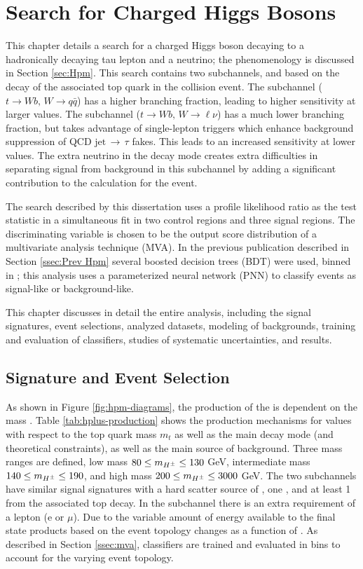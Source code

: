 \chapter{Search for Charged Higgs Bosons}\label{chap:hpana}
	This chapter details a search for a charged Higgs boson decaying to a hadronically decaying tau lepton and a neutrino; the phenomenology is discussed in Section \ref{sec:Hpm}. This search contains two subchannels, \taujets and \taulep based on the decay of the  associated top quark in the collision event. The \taujets subchannel ($t\rightarrow Wb, \, W \rightarrow q\bar{q}$)  has a higher branching fraction, leading to higher sensitivity at larger \mHpm values. The \taulep subchannel ($t\rightarrow Wb, \, W \rightarrow \ell \nu$)  has a much lower branching fraction, but takes advantage of single-lepton triggers which enhance background suppression of QCD $\mathrm{jet} \, \rightarrow \, \tau$ fakes. This leads to an increased sensitivity at lower \mHpm values. The extra neutrino in the \taulep decay mode creates extra difficulties in separating signal from background in this subchannel by adding a significant contribution to the \Etm calculation for the event. 

	The search described by this dissertation uses a profile likelihood ratio as the test statistic in a simultaneous fit in two control regions and three signal regions. The discriminating variable is chosen to be the output score distribution of a multivariate analysis technique (MVA). In the previous publication described in Section \ref{ssec:Prev Hpm} several boosted decision trees (BDT) were used, binned in \mHpm; this analysis uses a parameterized neural network (PNN) to classify events as signal-like or background-like.

	This chapter discusses in detail the entire analysis, including the signal signatures, event selections, analyzed datasets, modeling of backgrounds, training and evaluation of classifiers, studies of systematic uncertainties, and results.

	\section{Signature and Event Selection}\label{sec:signal}
		As shown in Figure \ref{fig:hpm-diagrams}, the production of the \Hpm is dependent on the mass \mHpm. Table \ref{tab:hplus-production} shows the production mechanisms for \mHpm values with respect to the top quark mass $m_t$ as well as the main decay mode (and theoretical constraints), as well as the main source of background. Three mass ranges are defined, low mass $80 \leq m_{H^{\pm}} \leq 130 $ GeV, intermediate mass $140 \leq m_{H^{\pm}} \leq 190$, and high mass $200 \leq m_{H^{\pm}} \leq 3000$ GeV.  The two subchannels have similar signal signatures with a hard scatter source of \Etm, one \tauhad, and at least 1 \bjet from the associated top decay. In the \taulep subchannel there is an extra requirement of a lepton (e or $\mu$). Due to the variable amount of energy available to the final state products based on \mHpm the event topology changes as a function of \mHpm. As described in Section \ref{ssec:mva}, classifiers are trained and evaluated in \mHpm bins to account for the varying event topology.

